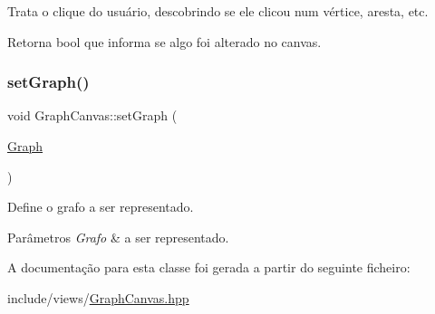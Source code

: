Trata o clique do usuário, descobrindo se ele clicou num vértice, aresta, etc. \begin{DoxyReturn}{Retorna}
bool que informa se algo foi alterado no canvas. 
\end{DoxyReturn}
\mbox{\label{classGraphCanvas_a1f402e85859d1eb3b6f1965de3def1af}} 
\subsubsection{\texorpdfstring{setGraph()}{setGraph()}}
{\footnotesize\ttfamily void Graph\+Canvas\+::set\+Graph (\begin{DoxyParamCaption}\item[{\mbox{\hyperlink{classGraph}{Graph}}}]{ }\end{DoxyParamCaption})}

Define o grafo a ser representado. 
\begin{DoxyParams}{Parâmetros}
{\em Grafo} & a ser representado. \\
\hline
\end{DoxyParams}


A documentação para esta classe foi gerada a partir do seguinte ficheiro\+:\begin{DoxyCompactItemize}
\item 
include/views/\mbox{\hyperlink{GraphCanvas_8hpp}{Graph\+Canvas.\+hpp}}\end{DoxyCompactItemize}
